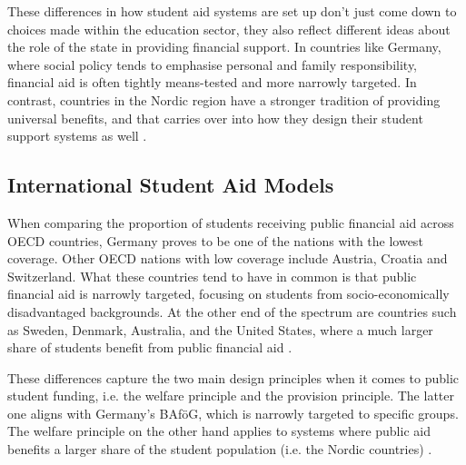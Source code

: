 These differences in how student aid systems are set up don’t just come down to choices made within the education sector, they also reflect different ideas about the role of the state in providing financial support. In countries like Germany, where social policy tends to emphasise personal and family responsibility, financial aid is often tightly means-tested and more narrowly targeted. In contrast, countries in the Nordic region have a stronger tradition of providing universal benefits, and that carries over into how they design their student support systems as well \citep{gwosc_krisenbewaltigung_2022, schwarz_study_2004}.


%
%
\subsection{International Student Aid Models} \label{subsection:international-sstudent-aid-models} 

When comparing the proportion of students receiving public financial aid across OECD countries, Germany proves to be one of the nations with the lowest coverage. Other OECD nations with low coverage include Austria, Croatia and Switzerland. What these countries tend to have in common is that public financial aid is narrowly targeted, focusing on students from socio-economically disadvantaged backgrounds. At the other end of the spectrum are countries such as Sweden, Denmark, Australia, and the United States, where a much larger share of students benefit from public financial aid \citep{oecd_education_2024}.

These differences capture the two main design principles when it comes to public student funding, i.e. the welfare principle and the provision principle. The latter one aligns with Germany's BAföG, which is narrowly targeted to specific groups. The welfare principle on the other hand applies to systems where public aid benefits a larger share of the student population (i.e. the Nordic countries) \citep{gwosc_krisenbewaltigung_2022}.

